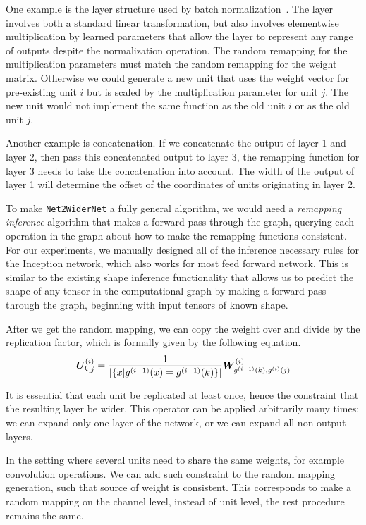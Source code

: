 \documentclass{article} %
\begin{document}
One example is the layer structure used by batch normalization~\citep{Ioffe+Szegedy-2015}.
The layer involves both a standard linear transformation, but also involves elementwise
multiplication by learned parameters that allow the layer to represent any range of outputs
despite the normalization operation.
The random remapping for the multiplication parameters must match the random remapping for
the weight matrix. Otherwise we could generate a new unit that uses the weight vector for
pre-existing unit $i$ but is scaled by the multiplication parameter for unit $j$. The new
unit would not implement the same function as the old unit $i$ or as the old unit $j$.

Another example is concatenation. If we concatenate the output of layer 1 and layer 2, then
pass this concatenated output to layer 3, the remapping function for layer 3 needs to take
the concatenation into account. The width of the output of layer 1 will determine the offset
of the coordinates of units originating in layer 2.

To make {\tt Net2WiderNet} a fully general algorithm, we would need a \emph{remapping inference} algorithm
that makes a forward pass through the graph, querying each operation in the graph about how to
make the remapping functions consistent. For our experiments, we manually designed all of the inference necessary rules
for the Inception network, which also works for most feed forward network.
This is similar to the existing shape inference functionality that allows us to predict the shape
of any tensor in the computational graph by making a forward pass through the graph, beginning
with input tensors of known shape.

After we get the random mapping, we can copy the weight over and divide by the replication factor, which is formally given
by the following equation.
\[
	{\bm{U}}^{(i)}_{k,j} = \frac{1}{|\{x| g^{(i-1)}(x) = g^{(i-1)}(k)\}|} {\bm{W}}^{(i)}_{g^{(i-1)}(k), g^{(i)}(j)}
\]


It is essential that each unit be replicated at least once, hence the
constraint that the resulting layer be wider.
This operator can be applied arbitrarily many times; we can expand only
one layer of the network, or we can expand all non-output layers.

In the setting where several units need to share the same weights, for example convolution operations.
We can add such constraint to the random mapping generation, such that source of weight is consistent.
This corresponds to make a random mapping on the channel level, instead of unit level, the rest
procedure remains the same.
\end{document}
